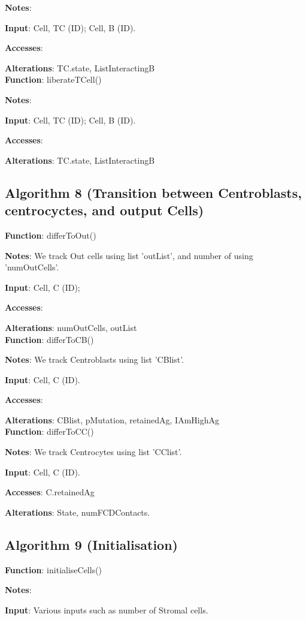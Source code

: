 \documentclass[english]{article}
\begin{document}
\textbf{Notes}:

\textbf{Input}: Cell, TC (ID); Cell, B (ID). 

\textbf{Accesses}:

\textbf{Alterations}: TC.state, ListInteractingB
\\
\textbf{Function}: liberateTCell()

\textbf{Notes}:

\textbf{Input}: Cell, TC (ID); Cell, B (ID). 

\textbf{Accesses}:

\textbf{Alterations}: TC.state, ListInteractingB


\subsection{Algorithm 8 (Transition between Centroblasts, centrocyctes, and output Cells)}	

\textbf{Function}: differToOut()

\textbf{Notes}: We track Out cells using list 'outList', and number of using 'numOutCells'.

\textbf{Input}: Cell, C (ID);

\textbf{Accesses}:

\textbf{Alterations}: numOutCells, outList
\\
\textbf{Function}: differToCB()

\textbf{Notes}: We track Centroblasts using list 'CBlist'.

\textbf{Input}: Cell, C (ID). 

\textbf{Accesses}:

\textbf{Alterations}: CBlist, pMutation, retainedAg, IAmHighAg
\\
\textbf{Function}: differToCC()

\textbf{Notes}: We track Centrocytes using list 'CClist'. 

\textbf{Input}: Cell, C (ID). 

\textbf{Accesses}: C.retainedAg

\textbf{Alterations}: State, numFCDContacts. 


\subsection{Algorithm 9 (Initialisation)}

\textbf{Function}: initialiseCells()

\textbf{Notes}: 

\textbf{Input}: Various inputs such as number of Stromal cells. 
\end{document}
